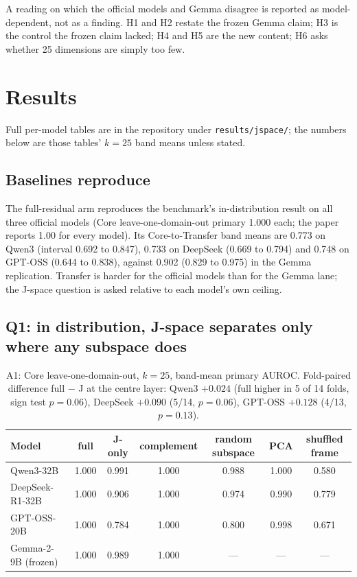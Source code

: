 \documentclass[11pt,a4paper]{article}
\begin{document}
A reading on which the official models and Gemma disagree is reported as model-dependent, not as a finding. H1 and H2 restate the frozen Gemma claim; H3 is the control the frozen claim lacked; H4 and H5 are the new content; H6 asks whether 25 dimensions are simply too few.

\section{Results}
\label{sec:results}

Full per-model tables are in the repository under \texttt{results/jspace/}; the numbers below are those tables' $k=25$ band means unless stated.

\subsection{Baselines reproduce}
\label{sec:baselines}

The full-residual arm reproduces the benchmark's in-distribution result on all three official models (Core leave-one-domain-out primary 1.000 each; the paper reports 1.00 for every model). Its Core-to-Transfer band means are 0.773 on Qwen3 (interval 0.692 to 0.847), 0.733 on DeepSeek (0.669 to 0.794) and 0.748 on GPT-OSS (0.644 to 0.838), against 0.902 (0.829 to 0.975) in the Gemma replication. Transfer is harder for the official models than for the Gemma lane; the J-space question is asked relative to each model's own ceiling.

\subsection{Q1: in distribution, J-space separates only where any subspace does}

\begin{table}[t]
\centering
\caption{A1: Core leave-one-domain-out, $k=25$, band-mean primary AUROC. Fold-paired difference full $-$ J at the centre layer: Qwen3 $+0.024$ (full higher in 5 of 14 folds, sign test $p=0.06$), DeepSeek $+0.090$ (5/14, $p=0.06$), GPT-OSS $+0.128$ (4/13, $p=0.13$).}
\label{tab:a1}
\small
\begin{tabular}{@{}lcccccc@{}}
\toprule
\textbf{Model} & \textbf{full} & \textbf{J-only} & \textbf{complement} & \textbf{random subspace} & \textbf{PCA} & \textbf{shuffled frame} \\
\midrule
Qwen3-32B & 1.000 & 0.991 & 1.000 & 0.988 & 1.000 & 0.580 \\
DeepSeek-R1-32B & 1.000 & 0.906 & 1.000 & 0.974 & 0.990 & 0.779 \\
GPT-OSS-20B & 1.000 & 0.784 & 1.000 & 0.800 & 0.998 & 0.671 \\
Gemma-2-9B (frozen) & 1.000 & 0.989 & 1.000 & --- & --- & --- \\
\bottomrule
\end{tabular}
\end{table}
\end{document}
